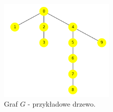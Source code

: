 \begin{figure}[H]
    \centering
    \includegraphics[width=0.5\textwidth]{assets/image.png}
    \caption{Graf $G$ - przykładowe drzewo.}
    \label{fig:drzewo}
\end{figure}

